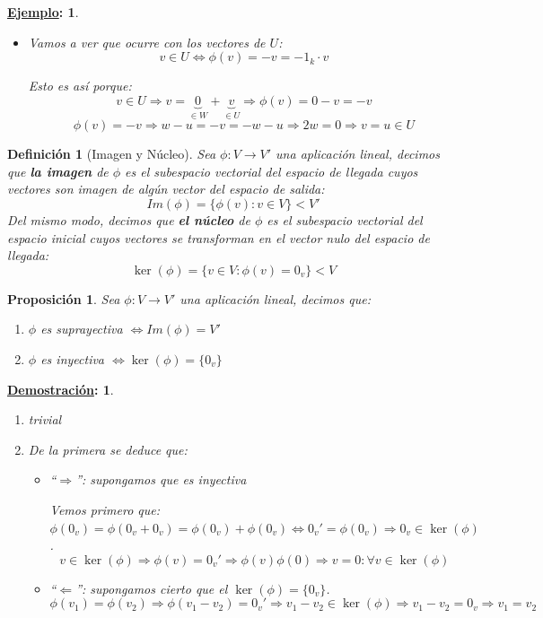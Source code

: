 \documentclass[10pt,a4paper,openright]{book}
\theoremstyle{break}
\newtheorem*{defi}{Definición}
\newtheorem*{prop}{Proposición}
\newtheorem*{demo}{\underline{Demostración}:}
\newtheorem*{ej}{\underline{Ejemplo}:}
\begin{document}
\begin{ej}
\begin{itemize}
\begin{itemize}
Esto es así porque:
$$v\in W\Rightarrow v=\underbrace{v}_{\in W}+\underbrace{0}_{\in U}\Rightarrow \phi(v)=v-0=v$$
$$\phi(v)=v\Rightarrow w-u=v=\underbrace{w}_{=v}+u\Rightarrow 2u=0\Rightarrow v=w\in W$$

\item Vamos a ver que ocurre con los vectores de $U$:
$$v\in U\Leftrightarrow \phi(v)=-v=-1_k\cdot v$$

Esto es así porque:
$$v\in U\Rightarrow v=\underbrace{0}_{\in W}+\underbrace{v}_{\in U}\Rightarrow \phi(v)=0-v=-v$$
$$\phi(v)=-v\Rightarrow w-u=-v=-w-u\Rightarrow 2w=0\Rightarrow v=u\in U$$
\end{itemize}
\end{itemize}
\end{ej}

\begin{defi}[Imagen y Núcleo]
Sea $\phi: V\longrightarrow V'$ una aplicación lineal, decimos que \textbf{la imagen} de $\phi$ es el subespacio vectorial del espacio de llegada cuyos vectores son imagen de algún vector del espacio de salida:
$$Im(\phi)=\{\phi(v): v\in V\}<V'$$
Del mismo modo, decimos que \textbf{el núcleo} de $\phi$ es el subespacio vectorial del espacio inicial cuyos vectores se transforman en el vector nulo del espacio de llegada:
$$\ker(\phi)=\{v\in V: \phi(v)=0_v\}<V$$
\end{defi}

\begin{prop}
Sea $\phi: V\longrightarrow V'$ una aplicación lineal, decimos que:
\begin{enumerate}
\item $\phi$ es suprayectiva $\Leftrightarrow Im(\phi)=V'$
\item $\phi$ es inyectiva $\Leftrightarrow \ker(\phi)=\{0_v\}$
\end{enumerate}
\end{prop}
\begin{demo}
\begin{enumerate}
\item trivial

\item De la primera se deduce que:
\begin{itemize}
\item ``$\Rightarrow$'': supongamos que es inyectiva\par
Vemos primero que: $\phi(0_v)=\phi(0_v+0_v)=\phi(0_v)+\phi(0_v)\Leftrightarrow 0_v'=\phi(0_v)\Rightarrow 0_v\in \ker(\phi)$.
$$v\in \ker(\phi)\Rightarrow \phi(v)=0_v'\Rightarrow \phi(v)\phi(0)\Rightarrow v=0:\forall v\in \ker(\phi)$$

\item ``$\Leftarrow$'': supongamos cierto que el $\ker(\phi)=\{0_v\}$.
$$\phi(v_1)=\phi(v_2)\Rightarrow \phi(v_1-v_2)=0_v'\Rightarrow v_1-v_2\in \ker(\phi)\Rightarrow v_1-v_2=0_v\Rightarrow v_1=v_2$$
\end{itemize}
\end{enumerate}
\end{demo}
\end{document}
